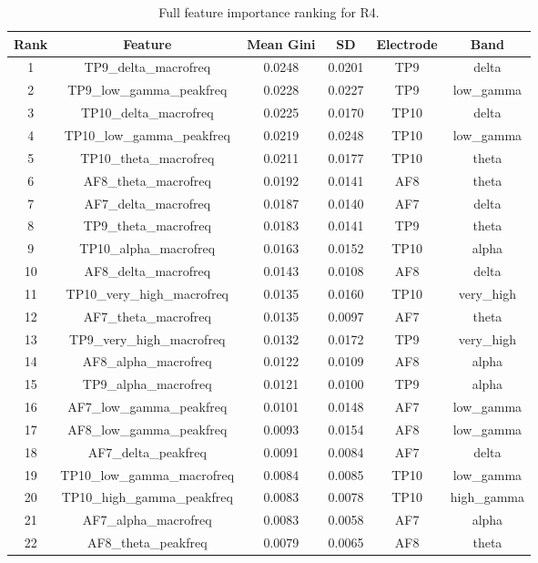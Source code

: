 \begin{table}[hptb]
\small
\centering
\begin{table}
\caption{Full feature importance ranking for R4.}
\label{tab:app_a_r4}
\begin{tabular}{cccccc}
\toprule
Rank & Feature & Mean Gini & SD & Electrode & Band \\
\midrule
1 & TP9_delta_macrofreq & 0.0248 & 0.0201 & TP9 & delta \\
2 & TP9_low_gamma_peakfreq & 0.0228 & 0.0227 & TP9 & low_gamma \\
3 & TP10_delta_macrofreq & 0.0225 & 0.0170 & TP10 & delta \\
4 & TP10_low_gamma_peakfreq & 0.0219 & 0.0248 & TP10 & low_gamma \\
5 & TP10_theta_macrofreq & 0.0211 & 0.0177 & TP10 & theta \\
6 & AF8_theta_macrofreq & 0.0192 & 0.0141 & AF8 & theta \\
7 & AF7_delta_macrofreq & 0.0187 & 0.0140 & AF7 & delta \\
8 & TP9_theta_macrofreq & 0.0183 & 0.0141 & TP9 & theta \\
9 & TP10_alpha_macrofreq & 0.0163 & 0.0152 & TP10 & alpha \\
10 & AF8_delta_macrofreq & 0.0143 & 0.0108 & AF8 & delta \\
11 & TP10_very_high_macrofreq & 0.0135 & 0.0160 & TP10 & very_high \\
12 & AF7_theta_macrofreq & 0.0135 & 0.0097 & AF7 & theta \\
13 & TP9_very_high_macrofreq & 0.0132 & 0.0172 & TP9 & very_high \\
14 & AF8_alpha_macrofreq & 0.0122 & 0.0109 & AF8 & alpha \\
15 & TP9_alpha_macrofreq & 0.0121 & 0.0100 & TP9 & alpha \\
16 & AF7_low_gamma_peakfreq & 0.0101 & 0.0148 & AF7 & low_gamma \\
17 & AF8_low_gamma_peakfreq & 0.0093 & 0.0154 & AF8 & low_gamma \\
18 & AF7_delta_peakfreq & 0.0091 & 0.0084 & AF7 & delta \\
19 & TP10_low_gamma_macrofreq & 0.0084 & 0.0085 & TP10 & low_gamma \\
20 & TP10_high_gamma_peakfreq & 0.0083 & 0.0078 & TP10 & high_gamma \\
21 & AF7_alpha_macrofreq & 0.0083 & 0.0058 & AF7 & alpha \\
22 & AF8_theta_peakfreq & 0.0079 & 0.0065 & AF8 & theta \\

\end{tabular}
\end{table}
\end{table}
